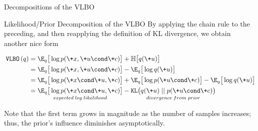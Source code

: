 \documentclass[10pt]{beamer}
\newcommand{\VLBO}{\,\texttt{VLBO}\,}
\begin{document}
\begin{frame}{Decompositions of the VLBO}
\begin{block}{Likelihood/Prior Decomposition of the VLBO}
By applying the chain rule to the preceding, and then reapplying the definition of KL divergence, we obtain another nice form

 \begin{align*}
\VLBO(q) &=   \E_q \big[ \log p(\+x, \+u \cond \+c) \big]  +  \mathbb{H} \big[q(\+u) \big] \\
& =  \E_q \big[ \log p(\+x, \+u \cond \+c) \big] - \E_q \big[ \log q(\+u) \big] \\
& =  \E_q \big[ \log p(\+x \cond \+u, \+c) \big] + \E_q \big[ \log p(\+u \cond \+c) \big] - \E_q \big[ \log q(\+u) \big] \\
&= \underset{expected \; log \; likelihood}{\E_q \big[ \log p(\+x \cond \+u, \+c) \big]}  -  \underset{divergence \; from \; prior}{\texttt{KL} \big(q(\+u ) \; || \; p(\+u \cond \+c)\big)}
\end{align*}
\end{block} 

 

Note that the first term grows in magnitude as the number of samples increases; thus, the prior's influence diminishes asymptotically.

\end{frame}
\end{document}
